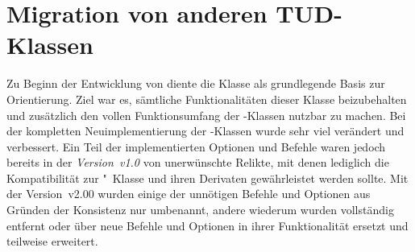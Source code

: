 \section[%
  Das Paket \PackageRaw{tudscrcomp}{\BooleanFalse}
  -- Migration von anderen TUD-Klassen%
]{%
  Migration von anderen TUD-Klassen%
}
%
\begin{DeclareEntity}{}
\noindent{}

\bigskip\noindent
Zu Beginn der Entwicklung von \TUDScript diente die Klasse  als 
grundlegende Basis zur Orientierung. Ziel war es, sämtliche Funktionalitäten 
dieser Klasse beizubehalten und zusätzlich den vollen Funktionsumfang der 
\KOMAScript-Klassen nutzbar zu machen. Bei der kompletten Neuimplementierung 
der \TUDScript-Klassen wurde sehr viel verändert und verbessert. Ein Teil der 
implementierten Optionen und Befehle waren jedoch bereits in der 
\emph{Version~v1.0} von \TUDScript unerwünschte Relikte, mit denen lediglich 
die Kompatibilität zur "~Klasse und ihren Derivaten 
gewährleistet werden sollte. Mit der Version~v2.00 wurden einige der unnötigen 
Befehle und Optionen aus Gründen der Konsistenz nur umbenannt, andere wiederum 
wurden vollständig entfernt oder über neue Befehle und Optionen in ihrer 
Funktionalität ersetzt und teilweise erweitert. 


\end{DeclareEntity}
